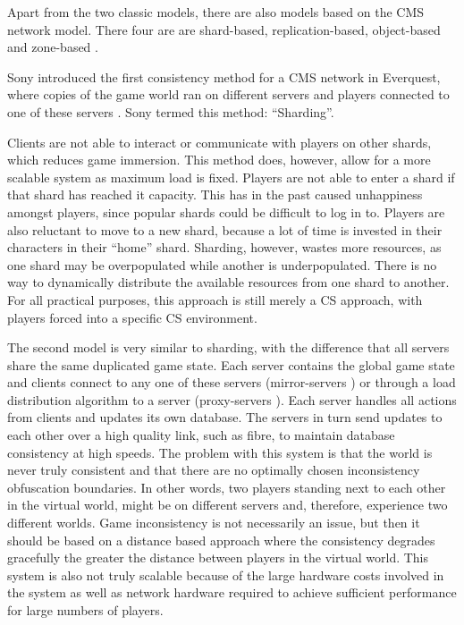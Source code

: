 \documentclass[journal,oneside,a4paper,onecolumn]{IEEEtran}
\begin{document}

Apart from the two classic models, there are also models based on the \ac{CMS} network model. There four are are shard-based, replication-based, object-based and zone-based \cite{Hu_voronoi_IM}.

Sony introduced the first consistency method for a \ac{CMS} network in Everquest, where copies of the game world ran on different servers and players connected to one of these servers \cite{engineering_everquest}. Sony termed this method: ``Sharding''.

Clients are not able to interact or communicate with players on other shards, which reduces game immersion. This method does, however, allow for a more scalable system as maximum load is fixed. Players are not able to enter a shard if that shard has reached it capacity. This has in the past caused unhappiness amongst players, since popular shards could be difficult to log in to. Players are also reluctant to move to a new shard, because a lot of time is invested in their characters in their ``home'' shard. Sharding, however, wastes more resources, as one shard may be overpopulated while another is underpopulated. There is no way to dynamically distribute the available resources from one shard to another. For all practical purposes, this approach is still merely a \ac{CS} approach, with players forced into a specific \ac{CS} environment.

The second model is very similar to sharding, with the difference that all servers share the same duplicated game state. Each server contains the global game state and clients connect to any one of these servers (mirror-servers \cite{mirrored_server}) or through a load distribution algorithm to a server (proxy-servers \cite{proxy_server_dist}). Each server handles all actions from clients and updates its own database. The servers in turn send updates to each other over a high quality link, such as fibre, to maintain database consistency at high speeds. The problem with this system is that the world is never truly consistent and that there are no optimally chosen inconsistency obfuscation boundaries. In other words, two players standing next to each other in the virtual world, might be on different servers and, therefore, experience two different worlds. Game inconsistency is not necessarily an issue, but then it should be based on a distance based approach where the consistency degrades gracefully the greater the distance between players in the virtual world. This system is also not truly scalable because of the large hardware costs involved in the system as well as network hardware required to achieve sufficient performance for large numbers of players.
\end{document}
